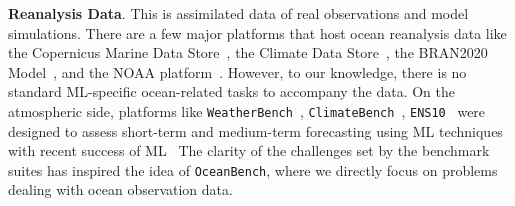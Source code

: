 \textbf{Reanalysis Data}. 
This is assimilated data of real observations and model simulations. 
There are a few major platforms that host ocean reanalysis data like the Copernicus Marine Data Store~\citep{MDSOCEANPHYSICS,MDSBIOGEOCHEMICAL,MDSOCEANPHYSICSENS,MDSWAVES}, the Climate Data Store~\citep{CDSREANALYSISSST}, the BRAN2020 Model~\citep{DATABLUELINK}, and the NOAA platform~\citep{DATANCEP}. 
However, to our knowledge, there is no standard ML-specific ocean-related tasks to accompany the data. On the atmospheric side, platforms like \texttt{WeatherBench}~\cite{weatherbench}, \texttt{ClimateBench}~\cite{ClimateBench}, \texttt{ENS10}~\cite{ENS10Bench} were designed to assess short-term and medium-term forecasting using ML techniques with recent success of ML~\cite{GraphCast,FourCastNet}
The clarity of the challenges set by the benchmark suites has inspired the idea of \texttt{OceanBench}, where we directly focus on problems dealing with ocean observation data.

